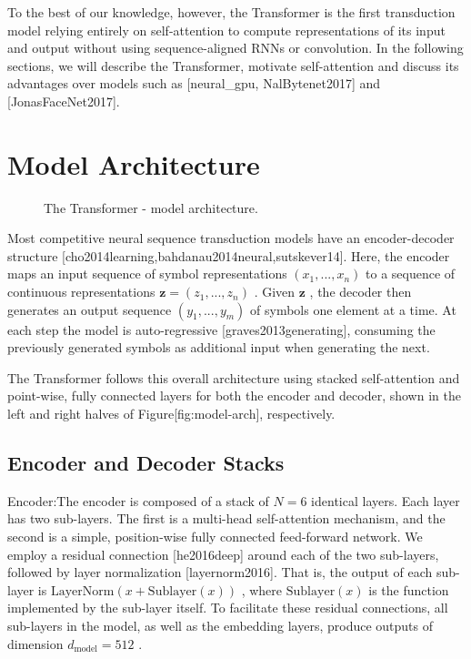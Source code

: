 \documentclass[11pt,a4paper]{article}
\begin{document}
To the best of our knowledge, however, the Transformer is the first transduction model relying entirely on self-attention to compute representations of its input and output without using sequence-aligned RNNs or convolution. In the following sections, we will describe the Transformer, motivate self-attention and discuss its advantages over models such as [neural\_gpu, NalBytenet2017] and [JonasFaceNet2017].

\section{Model Architecture}

\begin{figure}[h]
\caption{The Transformer - model architecture.}
\end{figure}

Most competitive neural sequence transduction models have an encoder-decoder structure [cho2014learning,bahdanau2014neural,sutskever14]. Here, the encoder maps an input sequence of symbol representations  $(x_1, ..., x_n)$  to a sequence of continuous representations  $\mathbf{z} = (z_1, ..., z_n)$ . Given  $\mathbf{z}$ , the decoder then generates an output sequence  $(y_1,...,y_m)$  of symbols one element at a time. At each step the model is auto-regressive [graves2013generating], consuming the previously generated symbols as additional input when generating the next.

The Transformer follows this overall architecture using stacked self-attention and point-wise, fully connected layers for both the encoder and decoder, shown in the left and right halves of Figure[fig:model-arch], respectively.

\subsection{Encoder and Decoder Stacks}

Encoder:The encoder is composed of a stack of  $N=6$  identical layers. Each layer has two sub-layers. The first is a multi-head self-attention mechanism, and the second is a simple, position-wise fully connected feed-forward network.   We employ a residual connection [he2016deep] around each of the two sub-layers, followed by layer normalization [layernorm2016].  That is, the output of each sub-layer is  $\mathrm{LayerNorm}(x + \mathrm{Sublayer}(x))$ , where  $\mathrm{Sublayer}(x)$  is the function implemented by the sub-layer itself.  To facilitate these residual connections, all sub-layers in the model, as well as the embedding layers, produce outputs of dimension  $d_{\text{model}}=512$ .
\end{document}
